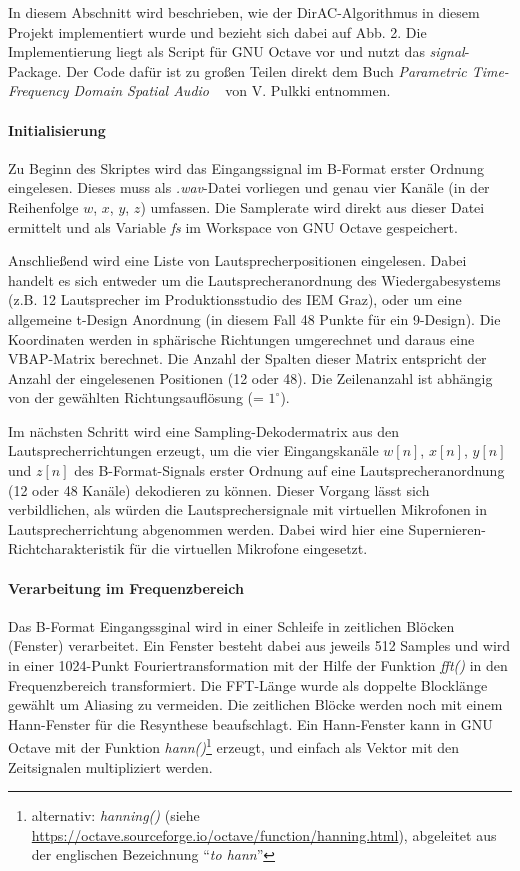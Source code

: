 In diesem Abschnitt wird beschrieben, wie der DirAC-Algorithmus in diesem Projekt implementiert wurde und bezieht sich dabei auf Abb. 2. Die Implementierung liegt als Script für GNU Octave vor und nutzt das \textit{signal}-Package. Der Code dafür ist zu großen Teilen direkt dem Buch \textit{Parametric Time-Frequency Domain Spatial Audio} ~\cite{spatial-book} von V. Pulkki entnommen.

\paragraph{Initialisierung}
Zu Beginn des Skriptes wird das Eingangssignal im B-Format erster Ordnung eingelesen. Dieses muss als \textit{.wav}-Datei vorliegen und genau vier Kanäle (in der Reihenfolge $w$, $x$, $y$, $z$) umfassen. Die Samplerate wird direkt aus dieser Datei ermittelt und als Variable \textit{fs} im Workspace von GNU Octave gespeichert.

Anschließend wird eine Liste von Lautsprecherpositionen eingelesen. Dabei handelt es sich entweder um die Lautsprecheranordnung des Wiedergabesystems (z.B. 12 Lautsprecher im Produktionsstudio des IEM Graz), oder um eine allgemeine t-Design Anordnung (in diesem Fall 48 Punkte für ein 9-Design). Die Koordinaten werden in sphärische Richtungen umgerechnet und daraus eine VBAP-Matrix berechnet. Die Anzahl der Spalten dieser Matrix entspricht der Anzahl der eingelesenen Positionen (12 oder 48). Die Zeilenanzahl ist abhängig von der gewählten Richtungsauflösung (= $1^{\circ}$). %

Im nächsten Schritt wird eine Sampling-Dekodermatrix \cite{ambi-book} aus den Lautsprecherrichtungen erzeugt, um die vier Eingangskanäle $w[n]$, $x[n]$, $y[n]$ und $z[n]$ des B-Format-Signals erster Ordnung auf eine Lautsprecheranordnung (12 oder 48 Kanäle) dekodieren zu können.
Dieser Vorgang lässt sich verbildlichen, als würden die Lautsprechersignale mit virtuellen Mikrofonen in Lautsprecherrichtung abgenommen werden. Dabei wird hier eine Supernieren-Richtcharakteristik für die virtuellen Mikrofone eingesetzt.

\paragraph{Verarbeitung im Frequenzbereich}
Das B-Format Eingangssginal wird in einer Schleife in zeitlichen Blöcken (Fenster) verarbeitet. Ein Fenster besteht dabei aus jeweils 512 Samples und wird in einer 1024-Punkt Fouriertransformation mit der Hilfe der Funktion \textit{fft()} in den Frequenzbereich transformiert. Die FFT-Länge wurde als doppelte Blocklänge gewählt um Aliasing zu vermeiden. Die zeitlichen Blöcke werden noch mit einem Hann-Fenster für die Resynthese beaufschlagt. Ein Hann-Fenster kann in GNU Octave mit der Funktion \textit{hann()}\footnote{alternativ: \textit{hanning()} (siehe \url{https://octave.sourceforge.io/octave/function/hanning.html}), abgeleitet aus der englischen Bezeichnung ``\textit{to hann}''} erzeugt, und einfach als Vektor mit den Zeitsignalen multipliziert werden.